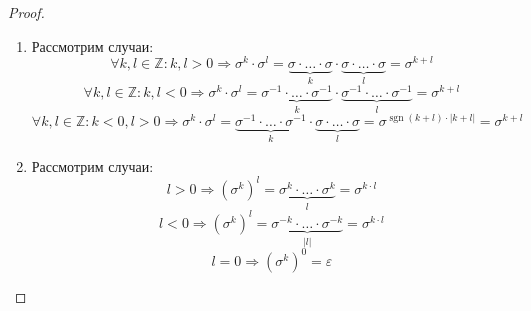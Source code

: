\documentclass[12pt]{article}
\newcommand{\MZ}{\mathbb{Z}}
\newcommand{\VE}{\varepsilon}
\theoremstyle{definition}
\DeclareMathOperator{\sgn}{sgn}
\begin{document}
\begin{proof}\hfill
	\begin{enumerate}[label=(\arabic*)]
		\item Рассмотрим случаи:
		$$
			\forall k,l \in \MZ \colon k, l > 0 \Rightarrow \sigma^k{\cdot}\sigma^l = \underbrace{\sigma{\cdot}\dotsc{\cdot}\sigma}_{k}{\cdot}\underbrace{\sigma{\cdot}\dotsc{\cdot}\sigma}_{l} = \sigma^{k + l}
		$$
		$$
			\forall k,l \in \MZ  \colon k, l <  0 \Rightarrow \sigma^k{\cdot}\sigma^l = \underbrace{\sigma^{-1}{\cdot}\dotsc{\cdot}\sigma^{-1}}_{k}{\cdot}\underbrace{\sigma^{-1}{\cdot}\dotsc{\cdot}\sigma^{-1}}_{l} = \sigma^{k + l}
		$$
		$$
			\forall k,l \in \MZ \colon k < 0, l > 0 \Rightarrow \sigma^k{\cdot}\sigma^l = \underbrace{\sigma^{-1}{\cdot}\dotsc{\cdot}\sigma^{-1}}_{k}{\cdot}\underbrace{\sigma{\cdot}\dotsc{\cdot}\sigma}_{l} = \sigma^{\sgn{(k+l)}{\cdot}|k+l|} = \sigma^{k + l}
		$$
		\item Рассмотрим случаи:		
		$$
			l > 0  \Rightarrow (\sigma^k)^l = \underbrace{\sigma^k{\cdot}\dotsc{\cdot}\sigma^{k}}_{l} = \sigma^{k{\cdot}l}
		$$
		$$
			l < 0 \Rightarrow (\sigma^k)^l = \underbrace{\sigma^{-k}{\cdot}\dotsc{\cdot}\sigma^{-k}}_{|l|} = \sigma^{k{\cdot}l}
		$$
		$$
			l = 0\Rightarrow (\sigma^k)^0 = \VE
		$$
	\end{enumerate}
\end{proof}
\end{document}
